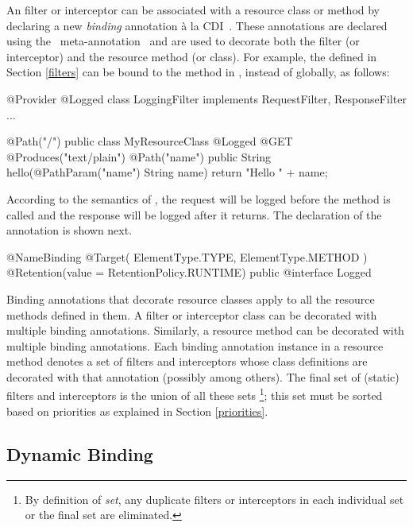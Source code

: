 An filter or interceptor can be associated with a resource class or method by declaring a new \emph{binding} annotation \`{a} la CDI~\cite{jsr299}. These annotations are declared using the \jaxrs\ meta-annotation \NameBinding\ and are used to decorate both the filter (or interceptor) and the resource method (or class). For example, the  defined in Section \ref{filters} can be bound to the method  in , instead of globally, as follows:

\begin{listing}{1}
@Provider
@Logged
class LoggingFilter implements RequestFilter, ResponseFilter {
    ...
}
\end{listing}

\begin{listing}{1}
@Path("/")
public class MyResourceClass {
    @Logged
    @GET
    @Produces("text/plain")
    @Path("{name}")
    public String hello(@PathParam("name") String name) {
        return "Hello " + name;
    }
}
\end{listing}

According to the semantics of , the request will be logged before the  method is called and the response will be logged after it returns. The declaration of the  annotation is shown next.

\begin{listing}{1}
@NameBinding
@Target({ ElementType.TYPE, ElementType.METHOD })
@Retention(value = RetentionPolicy.RUNTIME)
public @interface Logged { }
\end{listing}

Binding annotations that decorate resource classes apply to all the resource methods defined in them. A filter or interceptor class can be decorated with multiple binding annotations. Similarly, a resource method can be decorated with multiple binding annotations.  Each binding annotation instance in a resource method denotes a set of filters and interceptors whose class definitions are decorated with that annotation (possibly among others). The final set of (static) filters and interceptors is the union of all these sets \footnote{By definition of {\em set}, any duplicate filters or interceptors in each individual set or the final set are eliminated.}; this set must be sorted based on priorities as explained in Section \ref{priorities}. 

\subsection{Dynamic Binding}

